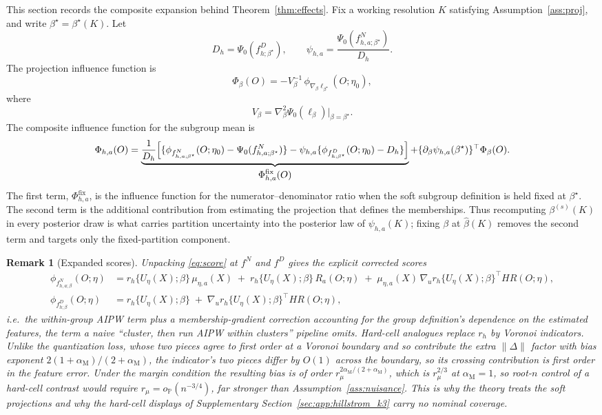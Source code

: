 \documentclass[11pt]{article}
\newtheorem{remark}{Remark}
\newcommand{\Pp}{\mathbb P}
\newcommand{\opro}{o_{\Pp}}
\newcommand{\norm}[1]{\lVert #1\rVert}
\newcommand{\am}{\alpha_{\mathrm M}}
\begin{document}
This section records the composite expansion behind Theorem~\ref{thm:effects}.  Fix a working resolution $K$ satisfying Assumption~\ref{ass:proj}, and write $\beta^\star=\beta^\star(K)$.  Let
\[
D_h=\Psi_0(f^D_{h;\beta^\star}),
\qquad
\psi_{h,a}
=
\frac{\Psi_0(f^N_{h,a;\beta^\star})}{D_h}.
\]
The projection influence function is
\[
\Phi_\beta(O)
=
-
V_\beta^{-1}\,
\phi_{\nabla_\beta\ell_{\beta^\star}}(O;\eta_0),
\]
where
\[
V_\beta
=
\nabla_\beta^2\Psi_0(\ell_\beta)\big|_{\beta=\beta^\star}.
\]
The composite influence function for the subgroup mean is
\begin{equation}\label{eq:compositeIF}
\Phi_{h,a}(O)
=
\underbrace{
\frac{1}{D_h}
\Bigl[
\{\phi_{f^N_{h,a;\beta^\star}}(O;\eta_0)-\Psi_0(f^N_{h,a;\beta^\star})\}
-
\psi_{h,a}
\{\phi_{f^D_{h;\beta^\star}}(O;\eta_0)-D_h\}
\Bigr]
}_{\displaystyle \Phi^{\mathrm{fix}}_{h,a}(O)}
+
\{\partial_\beta\psi_{h,a}(\beta^\star)\}^\top
\Phi_\beta(O).
\end{equation}
The first term, $\Phi^{\mathrm{fix}}_{h,a}$, is the influence function for the numerator--denominator ratio when the soft subgroup definition is held fixed at $\beta^\star$.  The second term is the additional contribution from estimating the projection that defines the memberships.  Thus recomputing $\beta^{(s)}(K)$ in every posterior draw is what carries partition uncertainty into the posterior law of $\psi_{h,a}(K)$; fixing $\beta$ at $\hat\beta(K)$ removes the second term and targets only the fixed-partition component.
\begin{remark}[Expanded scores]\label{rem:expandedscores}
Unpacking \eqref{eq:score} at $f^N$ and $f^D$ gives the explicit corrected scores
\begin{align*}
\phi_{f^N_{h,a;\beta}}(O;\eta)&=r_h\{U_\eta(X);\beta\}\,\mu_{\eta,a}(X)\;+\;r_h\{U_\eta(X);\beta\}\,R_a(O;\eta)\;+\;\mu_{\eta,a}(X)\,\nabla_ur_h\{U_\eta(X);\beta\}^\top HR(O;\eta),\\
\phi_{f^D_{h;\beta}}(O;\eta)&=r_h\{U_\eta(X);\beta\}\;+\;\nabla_ur_h\{U_\eta(X);\beta\}^\top HR(O;\eta),
\end{align*}
i.e.\ the within-group AIPW term plus a membership-gradient correction accounting for the group definition's dependence on the estimated features, the term a naive ``cluster, then run AIPW within clusters'' pipeline omits. Hard-cell analogues replace $r_h$ by Voronoi indicators. Unlike the quantization loss, whose two pieces agree to first order at a Voronoi boundary and so contribute the extra $\norm{\Delta}$ factor with bias exponent $2(1+\am)/(2+\am)$, the indicator's two pieces differ by $O(1)$ across the boundary, so its crossing contribution is first order in the feature error. Under the margin condition the resulting bias is of order $r_\mu^{2\am/(2+\am)}$, which is $r_\mu^{2/3}$ at $\am=1$, so root-$n$ control of a hard-cell contrast would require $r_\mu=\opro(n^{-3/4})$, far stronger than Assumption~\ref{ass:nuisance}. This is why the theory treats the soft projections and why the hard-cell displays of Supplementary Section~\ref{sec:app:hillstrom_k3} carry no nominal coverage.
\end{remark}
\end{document}
